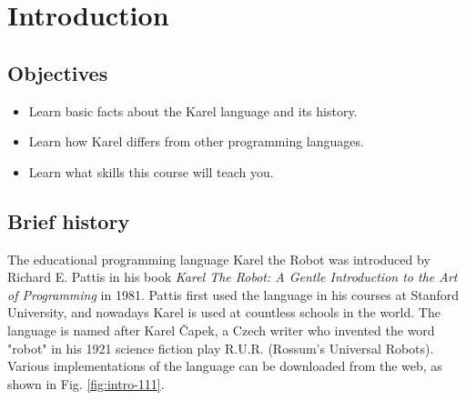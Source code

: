 \section{Introduction}

\subsection{Objectives} 

\begin{itemize}
\item Learn basic facts about the Karel language and its history. 
\item Learn how Karel differs from other programming languages.
\item Learn what skills this course will teach you.
\end{itemize}

\subsection{Brief history}

The educational programming language Karel the Robot was introduced by Richard E. 
Pattis in his book {\em Karel The Robot: A Gentle Introduction to the Art of Programming} in 1981. 
Pattis first used the language in his courses at Stanford University, and nowadays Karel is used at 
countless schools in the world. The language is named after Karel \v{C}apek, a Czech writer 
who invented the word "robot" in his 1921 science fiction play R.U.R. (Rossum's Universal Robots).
Various implementations of the language can be downloaded from the web, as shown in Fig. 
\ref{fig:intro-111}.

